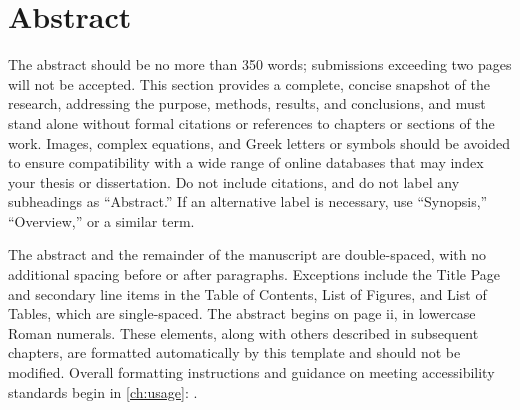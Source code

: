 \chapter[unnumbered=true]{Abstract}

The abstract should be no more than 350 words; submissions exceeding two pages will not be accepted.
This section provides a complete, concise snapshot of the research, addressing the purpose, methods, results, and conclusions, and must stand alone without formal citations or references to chapters or sections of the work.
Images, complex equations, and Greek letters or symbols should be avoided to ensure compatibility with a wide range of online databases that may index your thesis or dissertation.
Do not include citations, and do not label any subheadings as ``Abstract.”
If an alternative label is necessary, use ``Synopsis,” ``Overview,” or a similar term.

The abstract and the remainder of the manuscript are double-spaced, with no additional spacing before or after paragraphs.
Exceptions include the Title Page and secondary line items in the Table of Contents, List of Figures, and List of Tables, which are single-spaced.
The abstract begins on page ii, in lowercase Roman numerals.
These elements, along with others described in subsequent chapters, are formatted automatically by this template and should not be modified.
Overall formatting instructions and guidance on meeting accessibility standards begin in \autoref{ch:usage}: .
